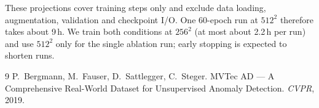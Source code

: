 \documentclass[11pt,a4paper]{article}
\begin{document}
These projections cover training steps only and exclude data loading, augmentation, validation and checkpoint I/O. One 60-epoch run at $512^2$ therefore takes about 9\,h. We train both conditions at $256^2$ (at most about 2.2\,h per run) and use $512^2$ only for the single ablation run; early stopping is expected to shorten runs.

\begin{thebibliography}{9}
 P.~Bergmann, M.~Fauser, D.~Sattlegger, C.~Steger. MVTec AD --- A Comprehensive Real-World Dataset for Unsupervised Anomaly Detection. \emph{CVPR}, 2019.
\end{thebibliography}
\end{document}
